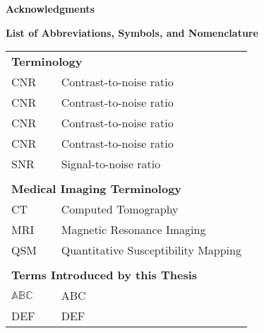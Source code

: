 \documentclass[hidelinks,12pt,oneside]{report}
\numberwithin{figure}{chapter}
\newenvironment{preliminary}%
{\pagestyle{plain}\pagenumbering{roman}}%
{\pagenumbering{arabic}}
\begin{document}
\begin{preliminary}
\vfill

\newpage

{}
\Large\begin{center}\textbf{Acknowledgments}\end{center}\normalsize

\vfill
\newpage
\singlespacing


\tableofcontents\newpage

\newpage
{}
{}
\begingroup
\sloppy
\setlength{\cftbeforefigskip}{4.5pt}  %
\listoffigures
\endgroup

\newpage
{}
{}
\begingroup
\sloppy
\setlength{\cftbeforefigskip}{4pt}  %
\listoftables
\endgroup

\newpage
{}
{}
\listofmyappendices\newpage

{}
\Large \textbf{List of Abbreviations, Symbols, and Nomenclature} \normalsize

\begin{tabular}{lcl}
\\
\multicolumn{3}{l}{\textbf{Terminology}}\\
CNR & & Contrast-to-noise ratio \\
CNR & & Contrast-to-noise ratio \\
CNR & & Contrast-to-noise ratio \\
CNR & & Contrast-to-noise ratio \\
SNR & \, & Signal-to-noise ratio \\
\\
\multicolumn{3}{l}{\textbf{Medical Imaging Terminology}}\\
CT & \, & Computed Tomography \\
MRI & \, & Magnetic Resonance Imaging \\
QSM & \, & Quantitative Susceptibility Mapping \\
\\
\multicolumn{3}{l}{\textbf{Terms Introduced by this Thesis}}\\
$\mathbb{ABC}$ && ABC \\
DEF & \, & DEF \\
\end{tabular}

\newpage
	
\clearpage


\end{preliminary}
\end{document}
